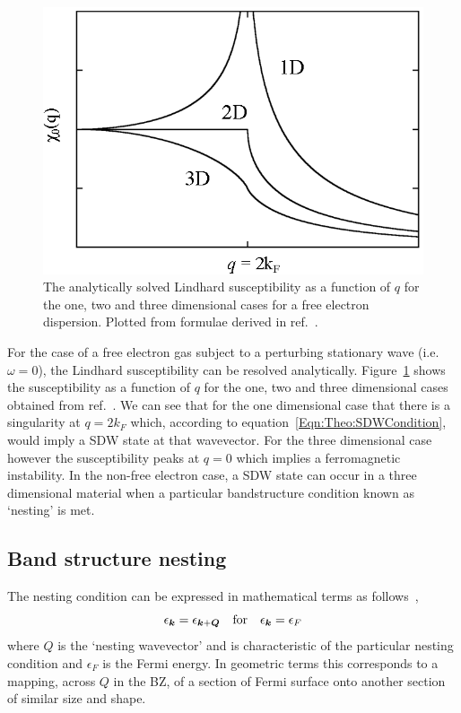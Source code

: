 \begin{figure}[htbp]
    \begin{center}
        \includegraphics[scale=0.9]{Chapter-Theory/Figures/LindhardFreeElectron/LindhardFreeElectron}
        \caption{The analytically solved Lindhard susceptibility as a function of $q$ for the one, two and three dimensional cases for a free electron dispersion. Plotted from formulae derived in ref.~\cite{Dressel2002}.}
        \label{Fig:Theo:LindhardFreeElectron}
    \end{center}
\end{figure}

For the case of a free electron gas subject to a perturbing stationary wave (i.e. $\omega=0$), the Lindhard susceptibility can be resolved analytically. Figure~\ref{Fig:Theo:LindhardFreeElectron} shows the susceptibility as a function of $q$ for the one, two and three dimensional cases obtained from ref.~\cite{Dressel2002}. We can see that for the one dimensional case that there is a singularity at $q=2k_F$ which, according to equation~\ref{Eqn:Theo:SDWCondition}, would imply a \ac{SDW} state at that wavevector. For the three dimensional case however the susceptibility peaks at $q=0$ which implies a ferromagnetic instability. In the non-free electron case, a \ac{SDW} state can occur in a three dimensional material when a particular bandstructure condition known as `nesting' is met.

\subsection{Band structure nesting}

The nesting condition can be expressed in mathematical terms as follows~\cite{Majlis2007},
\begin{equation}
    \label{Eqn:Theo:Nesting}
    \epsilon_{\boldsymbol{k}} = \epsilon_{\boldsymbol{k} + \boldsymbol{Q}} \quad \textrm{for} \quad \epsilon_{\boldsymbol{k}} = \epsilon_F
\end{equation}
where $Q$ is the `nesting wavevector' and is characteristic of the particular nesting condition and $\epsilon_F$ is the Fermi energy. In geometric terms this corresponds to a mapping, across $Q$ in the \ac{BZ}, of a section of Fermi surface onto another section of similar size and shape. 

